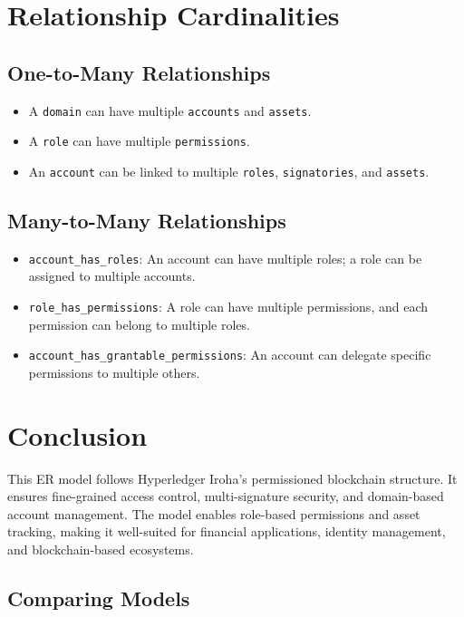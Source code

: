 \documentclass{article}
\begin{document}
\section{Relationship Cardinalities}
\subsection{One-to-Many Relationships}
\begin{itemize}
    \item A \texttt{domain} can have multiple \texttt{accounts} and \texttt{assets}.
    \item A \texttt{role} can have multiple \texttt{permissions}.
    \item An \texttt{account} can be linked to multiple \texttt{roles}, \texttt{signatories}, and \texttt{assets}.
\end{itemize}

\subsection{Many-to-Many Relationships}
\begin{itemize}
    \item \texttt{account\_has\_roles}: An account can have multiple roles; a role can be assigned to multiple accounts.
    \item \texttt{role\_has\_permissions}: A role can have multiple permissions, and each permission can belong to multiple roles.
    \item \texttt{account\_has\_grantable\_permissions}: An account can delegate specific permissions to multiple others.
\end{itemize}

\section{Conclusion}
This ER model follows Hyperledger Iroha’s permissioned blockchain structure. It ensures fine-grained access control, multi-signature security, and domain-based account management. The model enables role-based permissions and asset tracking, making it well-suited for financial applications, identity management, and blockchain-based ecosystems.




\subsection{Comparing Models}
\end{document}
